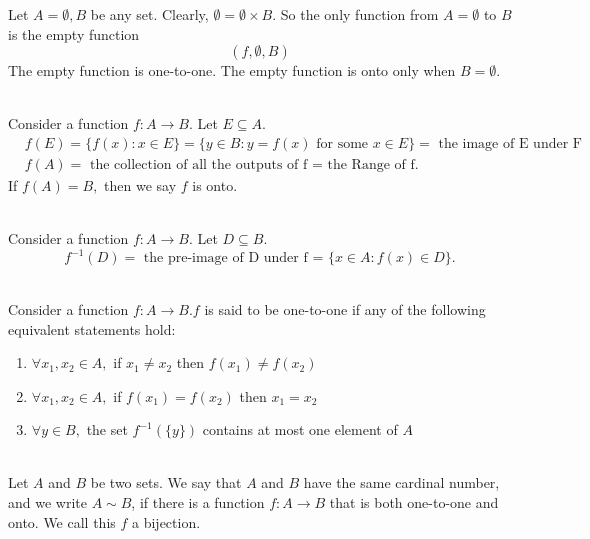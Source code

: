 \begin{example}
    Let $A=\emptyset, B$ be any set. Clearly, $\emptyset = \emptyset \times B.$ So the only function from $A=\emptyset$ to $B$ is the empty function $$(f, \emptyset, B)$$
    The empty function is one-to-one. The empty function is onto only when $B=\emptyset$.
\end{example}

\begin{definition} \leavevmode \\
    Consider a function $f:A\to B$. Let $E \subseteq A$.
    \begin{align*}
        &f(E)=\{f(x) : x \in E\}=\{y\in B : y=f(x) \text{ for some } x\in E\} = \text{ the image of E under F} \\
        &f(A) = \text{ the collection of all the outputs of f = the Range of f.}
    \end{align*}
    If $f(A) = B,$ then we say $f$ is onto. 
\end{definition}

\begin{definition} \leavevmode \\
    Consider a function $f:A\rightarrow B$. Let $D\subseteq B.$
    $$
        f^{-1}(D) = \text{ the pre-image of D under f = } \{ x\in A : f(x)\in D\}.
    $$
\end{definition}

\begin{definition} \leavevmode \\
    Consider a function $f:A\rightarrow B. f$ is said to be one-to-one if any of the following equivalent statements hold:
    \begin{enumerate}[$(i)$]
        \item $\forall x_1, x_2 \in A,$ if $x_1 \not = x_2$ then $f(x_1) \not = f(x_2)$
        \item $\forall x_1, x_2 \in A,$ if $f(x_1) = f(x_2)$ then $x_1 = x_2$
        \item $\forall y \in B,$ the set $f^{-1}(\{y\})$ contains at most one element of $A$
    \end{enumerate}
\end{definition}

\begin{definition}[Bijection] \leavevmode \\
    Let $A$ and $B$ be two sets. We say that $A$ and $B$ have the same cardinal number, and we write $A\sim B$, if there is a function $f:A\rightarrow B$ that is both one-to-one and onto. We call this $f$ a bijection.
\end{definition}

